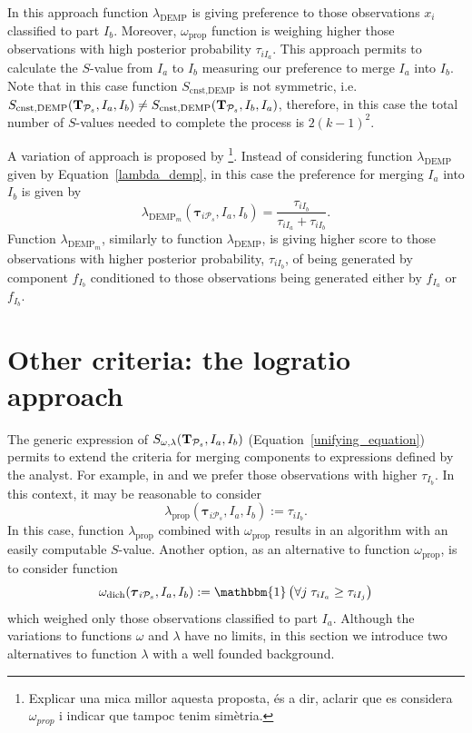 \documentclass[submit]{smj}
\theoremstyle{definition}
\newcommand{\m}[1]{\boldsymbol{#1}}
\begin{document}
In this approach function $\lambda_{\text{DEMP}}$ is giving preference to those observations $x_i$ classified to part $I_b$. Moreover, $\omega_{\text{prop}}$ function is weighing higher those observations with high posterior probability $\tau_{iI_a}$. This approach permits to calculate the $S$-value from $I_a$ to $I_b$ measuring our preference to merge $I_a$ into $I_b$. Note that in this case function  $S_{\text{cnst}, \text{DEMP}}$ is not symmetric, i.e. $S_{\text{cnst}, \text{DEMP}}(\text{\textbf{T}}_{\mathcal{P}_s},  I_a,  I_b) \neq S_{\text{cnst}, \text{DEMP}}(\text{\textbf{T}}_{\mathcal{P}_s},  I_b,  I_a)$, therefore, in this case the total number of $S$-values needed to complete the process is $2 (k-1)^2$.

A variation of \cite{hennig2010methods} approach is proposed by \cite{longford2014}\footnote{Explicar una mica millor aquesta proposta, és a dir, aclarir que es considera $\omega_{prop}$ i indicar que tampoc tenim simètria.}. Instead of considering function $\lambda_{\text{DEMP}}$ given by Equation~\ref{lambda_demp}, in this case the preference for merging $I_a$ into $I_b$ is given by
\[
\lambda_{\text{DEMP}_m}(\m\tau_{i \mathcal{P}_s},  I_a,  I_b) = \frac{\tau_{iI_b}}{\tau_{iI_a} + \tau_{iI_b}}.
\] 
Function $\lambda_{\text{DEMP}_m}$, similarly to function $\lambda_{\text{DEMP}}$, is giving higher score to those observations with higher posterior probability, $\tau_{iI_b}$, of being generated by component $f_{I_b}$ conditioned to those observations being generated either by $f_{I_a}$ or $f_{I_b}$.


\section{Other criteria: the logratio approach}\label{logratio_section}


The generic expression of $S_{\omega, \lambda}(\text{\textbf{T}}_{\mathcal{P}_s},  I_a,  I_b)$ (Equation~\ref{unifying_equation}) permits to extend the criteria for merging components to expressions defined by the analyst. For example, in \cite{hennig2010methods} and \cite{longford2014} we prefer those observations with higher $\tau_{I_b}$. In this context, it may be reasonable to consider
\[
\lambda_{\text{prop}}(\m\tau_{i \mathcal{P}_s},  I_a,  I_b) := \tau_{iI_b}.
\]
In this case, function $\lambda_{\text{prop}}$ combined with $\omega_{\text{prop}}$ results in an algorithm with an easily computable $S$-value. Another option, as an alternative to function $\omega_{\text{prop}}$, is to consider function 
\[
\omega_{\text{dich}}(\m\tau_{i \mathcal{P}_s},  I_a,  I_b) := \mathbbm{1}\left( \forall j\; \tau_{i I_{a}} \geq \tau_{iI_j} \right)
\]
which weighed only those observations classified to part $I_a$. Although the variations to functions $\omega$ and $\lambda$ have no limits, in this section we introduce two alternatives to function $\lambda$ with a well founded background.
\end{document}

